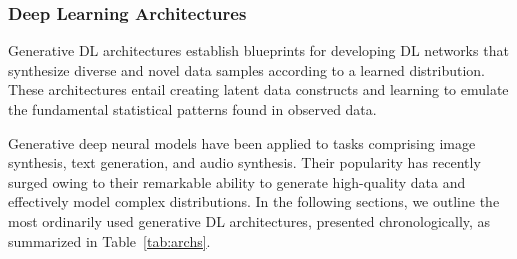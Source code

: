 \subsubsection{Deep Learning Architectures}

Generative \ac{DL} architectures establish blueprints for developing \ac{DL} networks that synthesize diverse and novel data samples according to a learned distribution. These architectures entail creating latent data constructs and learning to emulate the fundamental statistical patterns found in observed data.

Generative deep neural models have been applied to tasks comprising image synthesis, text generation, and audio synthesis. Their popularity has recently surged owing to their remarkable ability to generate high-quality data and effectively model complex distributions. In the following sections, we outline the most ordinarily used generative \ac{DL} architectures, presented chronologically, as summarized in Table~\ref{tab:archs}.

